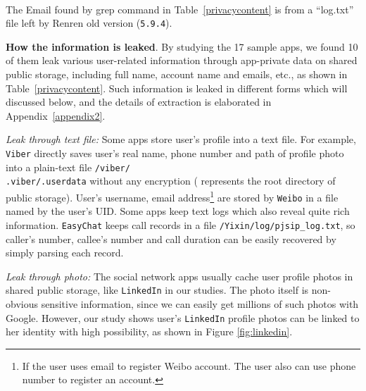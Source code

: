 \documentclass{sig-alternate}
\makeatletter
\newcommand{\tabincell}[2]{\begin{tabular}{@{}#1@{}}#2\end{tabular}}
\makeatother
\begin{document}
\begin{table}[htb]
\scalebox{0.8}{\usebox{\tableboxy}}
\\  The Email found by grep command in Table~\ref{privacycontent} is from a ``log.txt'' file left by Renren old version (\texttt{5.9.4}).
\end{table}



\noindent\textbf{How the information is leaked}. By studying the 17 sample apps, we found 10 of them leak various user-related information through app-private data on shared public storage, including full name, account name and emails, etc., as shown in Table~\ref{privacycontent}. Such information is leaked in different forms which will discussed below, and the details of extraction is elaborated in Appendix~\ref{appendix2}.

\vspace{2pt}\noindent \textit{Leak through text file:} Some apps store user's profile into a text file. For example, \texttt{Viber} directly saves user's real name, phone number and path of profile photo into a plain-text file \texttt{/viber/\\.viber/.userdata} without any encryption ( represents the root directory of public storage). User's username, email address\footnote{If the user uses email to register Weibo account. The user also can use phone number to register an account.} are stored by \texttt{Weibo} in a file named by the user's UID. Some apps keep text logs which also reveal quite rich information. \texttt{EasyChat} keeps call records in a file \texttt{/Yixin/log/pjsip\_log.txt}, so caller's number, callee's number and call duration can be easily recovered by simply parsing each record.


\vspace{2pt}\noindent \textit{Leak through photo:} The social network apps usually cache user profile photos in shared public storage, like \texttt{LinkedIn} in our studies. The photo itself is non-obvious sensitive information, since we can easily get millions of such photos with Google. However, our study shows user's \texttt{LinkedIn} profile photos can be linked to her identity with high possibility, as shown in Figure \ref{fig:linkedin}.
\end{document}
